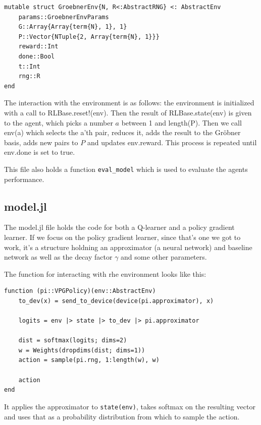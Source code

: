 \documentclass{article}
\theoremstyle{changedot}
\theoremstyle{changedotbreak}
\theoremstyle{nonumberplain}
\begin{document}
\begin{verbatim}
mutable struct GroebnerEnv{N, R<:AbstractRNG} <: AbstractEnv
    params::GroebnerEnvParams
    G::Array{Array{term{N}, 1}, 1}
    P::Vector{NTuple{2, Array{term{N}, 1}}}
    reward::Int
    done::Bool
    t::Int
    rng::R
end
\end{verbatim}

The interaction with the environment is as follows: the environment is initialized with a call to RLBase.reset!(env). Then the result of RLBase.state(env) is given to the agent, which picks a number $a$ between 1 and length(P). Then we call env(a) which selects the a'th pair, reduces it, adds the result to the Gröbner basis, adds new pairs to $P$ and updates env.reward. This process is repeated until env.done is set to true.

This file also holds a function \verb|eval_model| which is used to evaluate the agents performance.

\subsection{model.jl}
The model.jl file holds the code for both a Q-learner and a policy gradient learner. If we focus on the policy gradient learner, since that's one we got to work, it's a structure holdning an approximator (a neural network) and baseline network as well as the decay factor $\gamma$ and some other parameters.

The function for interacting with rhe environment looks like this:

\begin{verbatim}
function (pi::VPGPolicy)(env::AbstractEnv)
    to_dev(x) = send_to_device(device(pi.approximator), x)

    logits = env |> state |> to_dev |> pi.approximator

    dist = softmax(logits; dims=2)
    w = Weights(dropdims(dist; dims=1))
    action = sample(pi.rng, 1:length(w), w)

    action
end
\end{verbatim}

It applies the approximator to \verb|state(env)|, takes softmax on the resulting vector and uses that as a probability distribution from which to sample the action.
\end{document}
